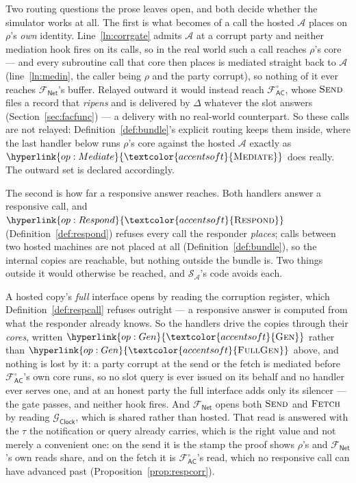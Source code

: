 \documentclass[10pt,oneside,openany]{book}
\newcommand{\Adv}{\mathcal{A}}
\newcommand{\Sim}{\mathcal{S}}
\newcommand{\op}[1]{\textnormal{\textsc{#1}}}
\newcommand{\opl}[1]{\hyperlink{op:#1}{\textcolor{accentsoft}{\op{#1}}}}
\newcommand{\fopl}[1]{\hyperlink{op:#1}{\textcolor{accentsoft}{\op{Full}\op{#1}}}}
\newcommand{\Gclock}{\mathcal{G}_{\mathsf{Clock}}}
\newcommand{\Fnet}{\mathcal{F}_{\mathsf{Net}}}
\newcommand{\Facz}{\mathcal{F}^{\circ}_{\mathsf{AC}}}
\theoremstyle{accentdef}
\theoremstyle{accentplain}
\begin{document}
Two routing questions the prose leaves open, and both decide whether the simulator works at all.
The first is what becomes of a call the hosted $\Adv$ places on $\rho$'s \emph{own} identity.
Line~\ref{ln:corrgate} admits $\Adv$ at a corrupt party and neither mediation hook fires on its
calls, so in the real world such a call reaches $\rho$'s core --- and every subroutine call that
core then places is mediated straight back to $\Adv$ (line~\ref{ln:medin}, the caller being $\rho$
and the party corrupt), so nothing of it ever reaches $\Fnet$'s buffer. Relayed outward it would
instead reach $\Facz$, whose $\op{Send}$ files a record that \emph{ripens} and is delivered by
$\Delta$ whatever the slot answers (Section~\ref{sec:facfunc}) --- a delivery with no real-world
counterpart. So these calls are not relayed: Definition~\ref{def:bundle}'s explicit routing keeps
them inside, where the last handler below runs $\rho$'s core against the hosted $\Adv$ exactly as
$\opl{Mediate}$ does really. The outward set is declared accordingly.

The second is how far a responsive answer reaches. Both handlers answer a responsive call, and
$\opl{Respond}$ (Definition~\ref{def:respond}) refuses every call the responder \emph{places};
calls between two hosted machines are not placed at all (Definition~\ref{def:bundle}), so the
internal copies are reachable, but nothing outside the bundle is. Two things outside it would
otherwise be reached, and $\Sim_{\Adv}$'s code avoids each.

A hosted copy's \emph{full} interface opens by reading the corruption register, which
Definition~\ref{def:respcall} refuses outright --- a responsive answer is computed from what the
responder already knows. So the handlers drive the copies through their \emph{cores}, written
$\opl{Gen}$ rather than $\fopl{Gen}$ above, and nothing is lost by it: a party corrupt at the send
or the fetch is mediated before $\Facz$'s own core runs, so no slot query is ever issued on its
behalf and no handler ever serves one, and at an honest party the full interface adds only its
silencer --- the gate passes, and neither hook fires. And $\Fnet$ opens both $\op{Send}$ and
$\op{Fetch}$ by reading $\Gclock$, which is shared rather than hosted. That read is answered with
the $\tau$ the notification or query already carries, which is the right value and not merely a
convenient one: on the send it is the stamp the proof shows $\rho$'s and $\Fnet$'s own reads
share, and on the fetch it is $\Facz$'s read, which no responsive call can have advanced past
(Proposition~\ref{prop:respcorr}).
\end{document}
